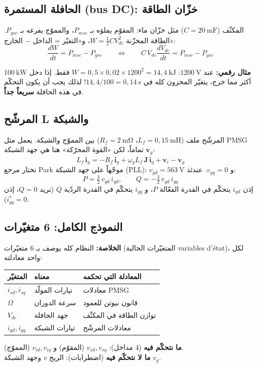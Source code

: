 \documentclass[11pt,a4paper]{article}
\newcommand{\fr}[1]{\textfrench{#1}}
\newcommand{\bv}[1]{\boldsymbol{#1}}
\newcommand{\Mithal}{\textbf{مثال رقمي: }}
\newcommand{\Khulasa}{\textbf{الخلاصة: }}
\begin{document}
\subsection{الحافلة المستمرة (\fr{bus DC}): خزّان الطاقة}
المكثّف ($C=20\ \mathrm{mF}$) مثل خزّان ماء: المقوّم يملؤه بـ $P_{msc}$، والمموّج يفرغه بـ $P_{gsc}$.
الطاقة المخزّنة $W = \tfrac12 C V_{dc}^2$، و«التغيّر = الداخل $-$ الخارج»:
\begin{equation}
\frac{dW}{dt} = P_{msc} - P_{gsc}\qquad\Longleftrightarrow\qquad C\,V_{dc}\frac{dV_{dc}}{dt}=P_{msc}-P_{gsc}
\end{equation}
\begin{mithal}
\Mithal
عند $1200\ \mathrm{V}$: $W = 0{,}5\times 0{,}02\times 1200^2 = 14{,}4\ \mathrm{kJ}$ فقط.
إذا دخل $100\ \mathrm{kW}$ أكثر مما خرج، يتغيّر المخزون كله في $14{,}4/100 = 0{,}14\ \mathrm{s}$!
لذلك يجب أن يكون التحكّم في هذه الحافلة \textbf{سريعاً جداً}.
\end{mithal}

\subsection{المرشّح \fr{L} والشبكة}
المرشّح ملف ($L_f=0{,}15\ \mathrm{mH}$، $R_f=2\ \mathrm{m\Omega}$) بين المموّج والشبكة. يعمل مثل
\fr{PMSG} تماماً، لكن «القوة المحرّكة» هنا هي جهد الشبكة $\bv{v}_g$:
\begin{equation}
L_f\,\dot{\bv{i}}_g = -R_f\,\bv{i}_g + \omega_g L_f\,\mathbf{J}\,\bv{i}_g + \bv{v}_i - \bv{v}_g
\end{equation}
نختار مرجع \fr{Park} موجّهاً على جهد الشبكة (\fr{PLL}): $v_{gd}=563\ \mathrm{V}$ و $v_{gq}=0$. عندئذ:
\begin{equation}
P = \tfrac32\,v_{gd}\,i_{gd},\qquad Q = -\tfrac32\,v_{gd}\,i_{gq}
\end{equation}
إذن $i_{gd}$ يتحكّم في القدرة الفعّالة $P$، و $i_{gq}$ يتحكّم في القدرة الردّية $Q$ (نريد $Q=0$، إذن $i_{gq}^*=0$).

\subsection{النموذج الكامل: 6 متغيّرات}
\begin{khulasa}
\Khulasa
النظام كله يوصف بـ 6 متغيّرات (المتغيّرات الحالية \fr{variables d'état})، لكل واحد معادلته:
\begin{center}
\begin{tabular}{lll}
\toprule
المتغيّر & معناه & المعادلة التي تحكمه\\
\midrule
$i_{sd}, i_{sq}$ & تيارات المولّد & معادلات \fr{PMSG}\\
$\Omega$ & سرعة الدوران & قانون نيوتن للعمود\\
$V_{dc}$ & جهد الحافلة & توازن الطاقة في المكثّف\\
$i_{gd}, i_{gq}$ & تيارات الشبكة & معادلات المرشّح\\
\bottomrule
\end{tabular}
\end{center}
\textbf{ما نتحكّم فيه} (4 مداخل): $v_{sd}, v_{sq}$ (المقوّم) و $v_{id}, v_{iq}$ (المموّج).\\
\textbf{ما لا نتحكّم فيه} (اضطرابات): الريح $v$ وجهد الشبكة $v_g$.
\end{khulasa}
\end{document}
